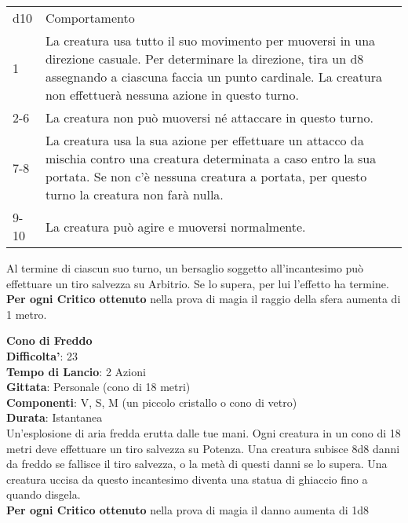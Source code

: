 \begin{multicols}{2}
\medskip

\begin{tabularx}{0.45\textwidth}{lX}
	\hline 
d10 & Comportamento\\ 
1 & La creatura usa tutto il suo movimento per muoversi in una direzione casuale. Per determinare la direzione, tira un d8 assegnando a ciascuna faccia un punto cardinale. La
creatura non effettuerà nessuna azione in questo turno. \\
2-6 & La creatura non può muoversi né attaccare in questo turno.\\
7-8 & La creatura usa la sua azione per effettuare un attacco da mischia contro una creatura determinata a caso entro la sua portata. Se non c’è nessuna creatura a portata, per questo turno la creatura non farà nulla.\\
9-10 & La creatura può agire e muoversi normalmente.\\
\end{tabularx} 

\medskip

Al termine di ciascun suo turno, un bersaglio soggetto all’incantesimo può effettuare un tiro salvezza su Arbitrio. Se lo supera, per lui l’effetto ha termine. \\
\textbf{Per ogni Critico ottenuto} nella prova di magia il raggio della sfera aumenta di 1 metro.

\medskip\textbf{Cono di Freddo}\\
\textbf{Difficolta'}: 23\\
\textbf{Tempo di Lancio}: 2 Azioni\\
\textbf{Gittata}: Personale (cono di 18 metri)\\
\textbf{Componenti}: V, S, M (un piccolo cristallo o cono di vetro)\\
\textbf{Durata}: Istantanea\\
Un’esplosione di aria fredda erutta dalle tue mani. Ogni creatura in un cono di 18 metri deve effettuare un tiro salvezza su Potenza. Una creatura subisce 8d8 danni da freddo se fallisce il tiro salvezza, o la metà di questi danni se lo supera. Una creatura uccisa da questo incantesimo diventa una statua di ghiaccio fino a quando disgela.\\
\textbf{Per ogni Critico ottenuto} nella prova di magia il danno aumenta di 1d8


\end{multicols}
